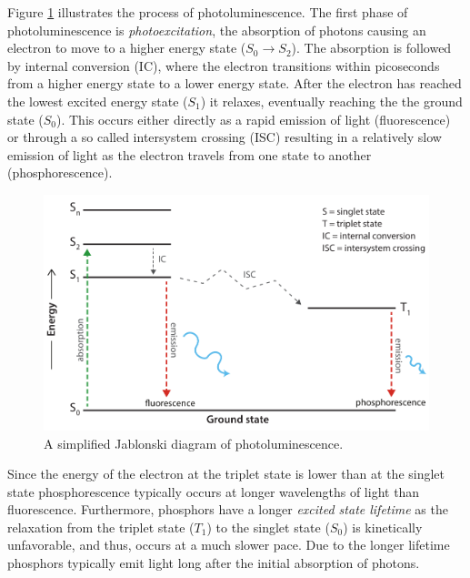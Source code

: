 \documentclass[thesis.tex]{subfiles}
\begin{document}
Figure \ref{figure:photoluminescence} illustrates the process of photoluminescence. The first phase of photoluminescence is \emph{photoexcitation}, the absorption of photons causing an electron to move to a higher energy state ($S_0 \rightarrow S_2$). The absorption is followed by internal conversion (IC), where the electron transitions within picoseconds from a higher energy state to a lower energy state. After the electron has reached the lowest excited energy state ($S_1$) it relaxes, eventually reaching the the ground state ($S_0$). This occurs either directly as a rapid emission of light (fluorescence) or through a so called intersystem crossing (ISC) resulting in a relatively slow emission of light as the electron travels from one state to another (phosphorescence).

\begin{figure}[hb]
\centering \includegraphics[width=\textwidth]{images/photoluminescence.pdf}
\caption{A simplified Jablonski diagram of photoluminescence. \label{figure:photoluminescence}}
\end{figure}

\noindent Since the energy of the electron at the triplet state is lower than at the singlet state phosphorescence typically occurs at longer wavelengths of light than fluorescence. Furthermore, phosphors have a longer \emph{excited state lifetime} as the relaxation from the triplet state ($T_1$) to the singlet state ($S_0$) is kinetically unfavorable, and thus, occurs at a much slower pace. Due to the longer lifetime phosphors typically emit light long after the initial absorption of photons. \cite{CEJ}
\end{document}
